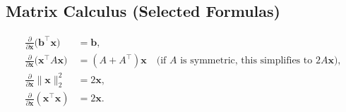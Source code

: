 \subsection{Matrix Calculus (Selected Formulas)}
\begin{align*}
\frac{\partial}{\partial \mathbf{x}} \bigl(\mathbf{b}^\top \mathbf{x}\bigr) &= \mathbf{b}, \\
\frac{\partial}{\partial \mathbf{x}} \bigl(\mathbf{x}^\top A \mathbf{x}\bigr) &= (A + A^\top)\mathbf{x} 
\quad \text{(if $A$ is symmetric, this simplifies to $2A\mathbf{x}$)},\\
\frac{\partial}{\partial \mathbf{x}} \|\mathbf{x}\|_2^2 &= 2\mathbf{x}, \\
\frac{\partial}{\partial \mathbf{x}} (\mathbf{x}^\top \mathbf{x}) &= 2\mathbf{x}.
\end{align*}

